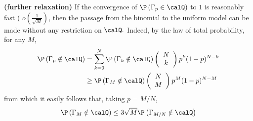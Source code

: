 \documentclass{article}
\newcommand{\bfs}[1]{\textbf{({#1}) }}
\begin{document}
\begin{rema}{\bfs{further relaxation}}
If the convergence of $\P \left(\Gamma_{p} \in \calQ \right)$ to $1$ is reasonably fast ( $o(\frac{1}{\sqrt{M}})$, then the passage from the binomial to the uniform model can be made without any restriction on $\calQ .$ Indeed, by the law of total probability, for any $M$,
\begin{align*}
\begin{aligned}
\P \left(\Gamma_{p} \notin \calQ \right) &=\sum_{k=0}^{N} \P \left(\Gamma_{k} \notin \calQ \right)\left(\begin{array}{c}
N \\
k
\end{array}\right) p^{k}(1-p)^{N-k} \\
& \geq \P \left(\Gamma_{M} \notin \calQ \right)\left(\begin{array}{c}
N \\
M
\end{array}\right) p^{M}(1-p)^{N-M}
\end{aligned}
\end{align*}
from which it easily follows that, taking $p=M / N$,
\begin{align*}
\P \left(\Gamma_{M} \notin \calQ \right) \leq 3 \sqrt{M} \P \left(\Gamma_{M / N} \notin \calQ \right)
\end{align*}
\end{rema}
\end{document}
